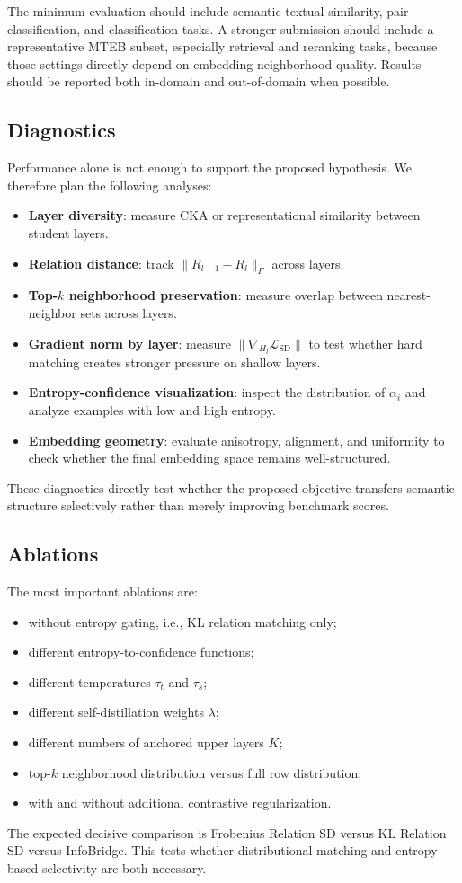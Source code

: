 \documentclass[letterpaper]{article}
\begin{document}
The minimum evaluation should include semantic textual similarity, pair classification, and classification tasks. A stronger submission should include a representative MTEB subset, especially retrieval and reranking tasks, because those settings directly depend on embedding neighborhood quality. Results should be reported both in-domain and out-of-domain when possible.

\subsection{Diagnostics}

Performance alone is not enough to support the proposed hypothesis. We therefore plan the following analyses:
\begin{itemize}
    \item \textbf{Layer diversity}: measure CKA or representational similarity between student layers.
    \item \textbf{Relation distance}: track $\|R_{l+1}-R_l\|_F$ across layers.
    \item \textbf{Top-$k$ neighborhood preservation}: measure overlap between nearest-neighbor sets across layers.
    \item \textbf{Gradient norm by layer}: measure $\|\nabla_{H_l}\mathcal{L}_{\mathrm{SD}}\|$ to test whether hard matching creates stronger pressure on shallow layers.
    \item \textbf{Entropy-confidence visualization}: inspect the distribution of $\alpha_i$ and analyze examples with low and high entropy.
    \item \textbf{Embedding geometry}: evaluate anisotropy, alignment, and uniformity to check whether the final embedding space remains well-structured.
\end{itemize}
These diagnostics directly test whether the proposed objective transfers semantic structure selectively rather than merely improving benchmark scores.

\subsection{Ablations}

The most important ablations are:
\begin{itemize}
    \item without entropy gating, i.e., KL relation matching only;
    \item different entropy-to-confidence functions;
    \item different temperatures $\tau_t$ and $\tau_s$;
    \item different self-distillation weights $\lambda$;
    \item different numbers of anchored upper layers $K$;
    \item top-$k$ neighborhood distribution versus full row distribution;
    \item with and without additional contrastive regularization.
\end{itemize}
The expected decisive comparison is Frobenius Relation SD versus KL Relation SD versus InfoBridge. This tests whether distributional matching and entropy-based selectivity are both necessary.
\end{document}
